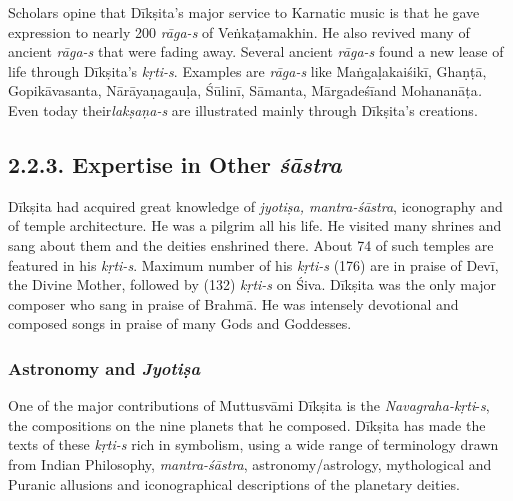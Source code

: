 Scholars opine that Dīkṣita’s major service to Karnatic music is that he gave expression to nearly 200 \textit{rāga-s} of Veṅkaṭamakhin. He also revived many of ancient \textit{rāga-s} that were fading away. Several ancient \textit{rāga-s} found a new lease of life through Dīkṣita’s \textit{kṛti-s}. Examples are \textit{rāga-s} like Maṅgaḷakaiśikī, Ghaṇṭā, Gopikāvasanta, Nārāyaṇagauḷa, Śūlinī, Sāmanta, Mārgadeśīand Mohananāṭa\textit{. }Even today their\break \textit{lakṣaṇa-s} are illustrated mainly through Dīkṣita’s creations.

\vspace{-.3cm}

\subsection*{2.2.3. Expertise in Other \textit{śāstra}}

Dīkṣita had acquired great knowledge of \textit{jyotiṣa, mantra-śāstra}, iconography and of temple architecture. He was a pilgrim all his life. He visited many shrines and sang about them and the deities enshrined there. About 74 of such temples are featured in his \textit{kṛti-s}. Maximum number of his \textit{kṛti-s} (176) are in praise of Devī, the Divine Mother, followed by (132) \textit{kṛti-s} on Śiva. Dīkṣita was the only major composer who sang in praise of Brahmā. He was intensely devotional and composed songs in praise of many Gods and Goddesses.

\vspace{-.2cm}

\subsubsection*{Astronomy and \textit{Jyotiṣa}}

\vspace{-.2cm}

One of the major contributions of Muttusvāmi Dīkṣita is the \textit{Navagraha-kṛti}-\textit{s}, the compositions on the nine planets that he composed. Dīkṣita has made the texts of these \textit{kṛti-s} rich in symbolism, using a wide range of terminology drawn from Indian Philosophy, \textit{mantra-śāstra}, astronomy/astrology, mythological and Puranic allusions and iconographical descriptions of the planetary deities.

